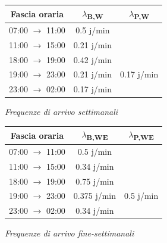 \documentclass[a4paper, 12pt]{article}
\newcommand{\xmark}[0]{\ding{55}}
\begin{document}
\begin{minipage}{.5\textwidth}
\centering             
\begin{tabular}{ |c|c|c| }
	\hline
    \cellcolor{cellcolor} Fascia oraria & \cellcolor{cellcolor}$\lambda${\textsubscript{B,W}} & \cellcolor{cellcolor}$\lambda${\textsubscript{P,W}} \\
	\hline
    \hline

	07:00 $\rightarrow$ 11:00 & 0.5 j/min & \xmark \\

    \hline
    

	11:00 $\rightarrow$ 15:00 & 0.21 j/min & \xmark \\

    \hline
    

	18:00 $\rightarrow$ 19:00 & 0.42 j/min & \xmark \\

    \hline
    

	19:00 $\rightarrow$ 23:00 & 0.21 j/min & 0.17 j/min \\

    \hline
    

	23:00 $\rightarrow$ 02:00 & 0.17 j/min & \xmark \\

    \hline
\end{tabular}
\bigskip
              
\textit{Frequenze di arrivo settimanali}
\end{minipage}
%
\begin{minipage}{.5\textwidth}
\centering
\begin{tabular}{ |c|c|c| }
	\hline
    \cellcolor{cellcolor}Fascia oraria & \cellcolor{cellcolor}$\lambda${\textsubscript{B,WE}}
    &\cellcolor{cellcolor} $\lambda${\textsubscript{P,WE}} \\
    \hline
    \hline
	07:00 $\rightarrow$ 11:00 & 0.5 j/min & \xmark \\ 
    \hline
	11:00 $\rightarrow$ 15:00 & 0.34 j/min & \xmark \\
    \hline
	18:00 $\rightarrow$ 19:00 & 0.75 j/min & \xmark \\
    \hline
	19:00 $\rightarrow$ 23:00 & 0.375 j/min & 0.5 j/min \\
    \hline
	23:00 $\rightarrow$ 02:00 & 0.34 j/min & \xmark \\
    \hline
\end{tabular}
\bigskip
              
\textit{Frequenze di arrivo fine-settimanali} 
\end{minipage} 
\bigskip
\end{document}
